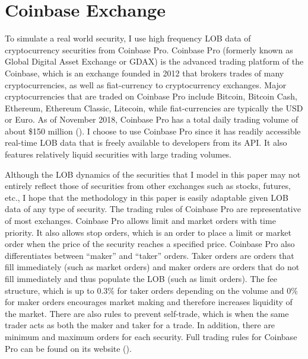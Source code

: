 \section{Coinbase Exchange}

To simulate a real world security, I use high frequency LOB data of cryptocurrency securities from Coinbase Pro. Coinbase Pro (formerly known as Global Digital Asset Exchange or GDAX) is the advanced trading platform of the Coinbase, which is an exchange founded in 2012 that brokers trades of many cryptocurrencies, as well as fiat-currency to cryptocurrency exchanges. Major cryptocurrencies that are traded on Coinbase Pro include Bitcoin, Bitcoin Cash, Ethereum, Ethereum Classic, Litecoin, while fiat-currencies are typically the USD or Euro. As of November 2018, Coinbase Pro has a total daily trading volume of about \$150 million (\cite{L1}). I choose to use Coinbase Pro since it has readily accessible real-time LOB data that is freely available to developers from its API. It also features relatively liquid securities with large trading volumes. 

Although the LOB dynamics of the securities that I model in this paper may not entirely reflect those of securities from other exchanges such as stocks, futures, etc., I hope that the methodology in this paper is easily adaptable given LOB data of any type of security. The trading rules of Coinbase Pro are representative of most exchanges. Coinbase Pro allows limit and market orders with time priority. It also allows stop orders, which is an order to place a limit or market order when the price of the security reaches a specified price. Coinbase Pro also differentiates between “maker” and “taker” orders. Taker orders are orders that fill immediately (such as market orders) and maker orders are orders that do not fill immediately and thus populate the LOB (such as limit orders). The fee structure, which is up to 0.3\% for taker orders depending on the volume and 0\% for maker orders encourages market making and therefore increases liquidity of the market. There are also rules to prevent self-trade, which is when the same trader acts as both the maker and taker for a trade. In addition, there are minimum and maximum orders for each security. Full trading rules for Coinbase Pro can be found on its website (\cite{L2}).


